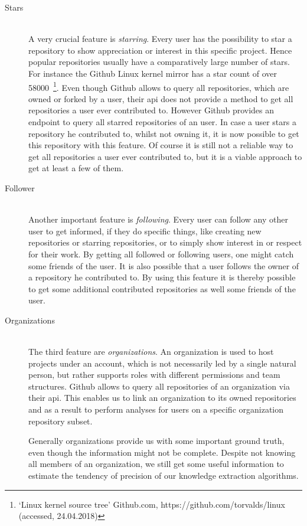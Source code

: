 \begin{description}
    \item[Stars] \hfill \\
        A very crucial feature is \emph{starring}. Every user has the possibility to star a repository to show appreciation or interest in this specific project.
        Hence popular repositories usually have a comparatively large number of stars. For instance the Github Linux kernel mirror has a star count of over 58000~\footnote{`Linux kernel source tree' Github.com, https://github.com/torvalds/linux (accessed, 24.04.2018)}.
        Even though Github allows to query all repositories, which are owned or forked by a user, their \ac{api} does not provide a method to get all repositories a user ever contributed to.
        However Github provides an endpoint to query all starred repositories of an user.
        In case a user stars a repository he contributed to, whilst not owning it, it is now possible to get this repository with this feature.
        Of course it is still not a reliable way to get all repositories a user ever contributed to, but it is a viable approach to get at least a few of them.

    \item[Follower] \hfill \\
        Another important feature is \emph{following}.
        Every user can follow any other user to get informed, if they do specific things, like creating new repositories or starring repositories, or to simply show interest in or respect for their work.
        By getting all followed or following users, one might catch some friends of the user.
        It is also possible that a user follows the owner of a repository he contributed to.
        By using this feature it is thereby possible to get some additional contributed repositories as well some friends of the user.

    \item[Organizations] \hfill \\
        The third feature are \emph{organizations}.
        An organization is used to host projects under an account, which is not necessarily led by a single natural person, but rather supports roles with different permissions and team structures.
        Github allows to query all repositories of an organization via their \ac{api}.
        This enables us to link an organization to its owned repositories and as a result to perform analyses for users on a specific organization repository subset.

        Generally organizations provide us with some important ground truth, even though the information might not be complete.
        Despite not knowing all members of an organization, we still get some useful information to estimate the tendency of precision of our knowledge extraction algorithms.
\end{description}
